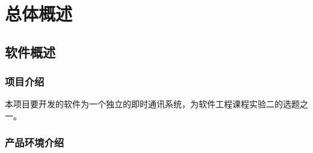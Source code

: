 \chapter{总体概述}


\section{软件概述}
\subsection{项目介绍}


本项目要开发的软件为一个独立的即时通讯系统，为软件工程课程实验二的选题之一。

\subsection{产品环境介绍}

